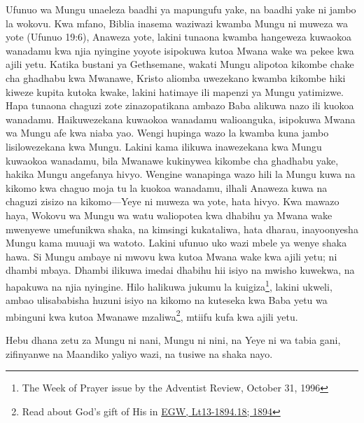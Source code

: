 Ufunuo wa Mungu unaeleza baadhi ya mapungufu yake, na baadhi yake ni jambo la wokovu. Kwa mfano, Biblia inasema waziwazi kwamba Mungu ni muweza wa yote (Ufunuo 19:6), Anaweza yote, lakini tunaona kwamba hangeweza kuwaokoa wanadamu kwa njia nyingine yoyote isipokuwa kutoa Mwana wake wa pekee kwa ajili yetu. Katika bustani ya Gethsemane, wakati Mungu alipotoa kikombe chake cha ghadhabu kwa Mwanawe, Kristo aliomba uwezekano kwamba kikombe hiki kiweze kupita kutoka kwake, lakini hatimaye ili mapenzi ya Mungu yatimizwe. Hapa tunaona chaguzi zote zinazopatikana ambazo Baba alikuwa nazo ili kuokoa wanadamu. Haikuwezekana kuwaokoa wanadamu walioanguka, isipokuwa Mwana wa Mungu afe kwa niaba yao. Wengi hupinga wazo la kwamba kuna jambo lisilowezekana kwa Mungu. Lakini kama ilikuwa inawezekana kwa Mungu kuwaokoa wanadamu, bila Mwanawe kukinywea kikombe cha ghadhabu yake, hakika Mungu angefanya hivyo. Wengine wanapinga wazo hili la Mungu kuwa na kikomo kwa chaguo moja tu la kuokoa wanadamu, ilhali Anaweza kuwa na chaguzi zisizo na kikomo—Yeye ni muweza wa yote, hata hivyo. Kwa mawazo haya, Wokovu wa Mungu wa watu waliopotea kwa dhabihu ya Mwana wake mwenyewe umefunikwa shaka, na kimsingi kukataliwa, hata dharau, inayoonyesha Mungu kama muuaji wa watoto. Lakini ufunuo uko wazi mbele ya wenye shaka hawa. Si Mungu ambaye ni mwovu kwa kutoa Mwana wake kwa ajili yetu; ni dhambi mbaya. Dhambi ilikuwa imedai dhabihu hii isiyo na mwisho kuwekwa, na hapakuwa na njia nyingine. Hilo halikuwa jukumu la kuigiza\footnote{The Week of Prayer issue by the Adventist Review, October 31, 1996}, lakini ukweli, ambao ulisababisha huzuni isiyo na kikomo na kuteseka kwa Baba yetu wa mbinguni kwa kutoa Mwanawe mzaliwa\footnote{Read about God's gift of His  in \href{https://egwwritings.org/?ref=en_Lt13-1894.18&para=5486.24}{{EGW, Lt13-1894.18; 1894}}}, mtiifu kufa kwa ajili yetu.

Hebu dhana zetu za Mungu ni nani, Mungu ni nini, na Yeye ni wa tabia gani, zifinyanwe na Maandiko yaliyo wazi, na tusiwe na shaka nayo.


